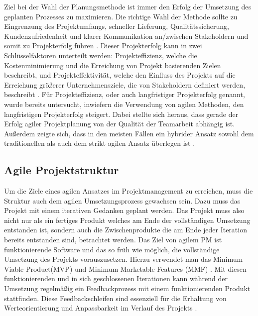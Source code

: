 Ziel bei der Wahl der Planungsmethode ist immer den Erfolg der Umsetzung des geplanten Prozesses zu maximieren.
Die richtige Wahl der Methode sollte zu Eingrenzung des Projektumfangs, schneller Lieferung, Qualitätssicherung, Kundenzufriedenheit und klarer Kommunikation an/zwischen Stakeholdern und somit zu Projekterfolg führen \cite{systemsApproachToPlanningSchedulingAndControlling}.
Dieser Projekterfolg kann in zwei Schlüsselfaktoren unterteilt werden: Projekteffizienz, welche die Kostenminimierung und die Erreichung von Projekt basierenden Zielen beschreibt, und Projekteffektivität, welche den Einfluss des Projekts auf die Erreichung größerer Unternehmensziele, die von Stakeholdern definiert werden, beschreibt \cite{relationshipBetweenProjectSuccessAndProjectEfficiency}.
Für Projekteffizienz, oder auch langfristiger Projekterfolg genannt, wurde bereits untersucht, inwiefern die Verwendung von agilen Methoden, den langfristigen Projekterfolg steigert. Dabei stellte sich heraus, dass gerade der Erfolg agiler Projektplanung von der Qualität der Teamarbeit abhängig ist.
Außerdem zeigte sich, dass in den meisten Fällen ein hybrider Ansatz sowohl dem traditionellen als auch dem strikt agilen Ansatz überlegen ist \cite{traditionalAndAgileOnProjectSuccess}.

\subsection{Agile Projektstruktur}
Um die Ziele eines agilen Ansatzes im Projektmanagement zu erreichen, muss die Struktur auch dem agilen Umsetzungsprozess gewachsen sein. Dazu muss das Projekt mit einem iterativen Gedanken geplant werden. Das Projekt muss also nicht nur als ein fertiges Produkt welches am Ende der vollständigen Umsetzung entstanden ist, sondern auch die Zwischenprodukte die am Ende jeder Iteration bereits entstanden sind, betrachtet werden. Das Ziel von agilem PM ist funktionierende Software und das so früh wie möglich, die vollständige Umsetzung des Projekts vorauszusetzen. Hierzu verwendet man das Minimum Viable Product(MVP) und Minimum Marketable Features (MMF) \cite{agilesProjektmanagementImBerufsalltagMVPundMMF}.  Mit diesen funktionierenden und in sich geschlossenen Iterationen kann während der Umsetzung regelmäßig ein Feedbackprozess mit einem funktionierenden Produkt stattfinden. Diese Feedbackschleifen sind essenziell für die Erhaltung von Werteorientierung und Anpassbarkeit im Verlauf des Projekts \cite{AMORIM2021101496}.

